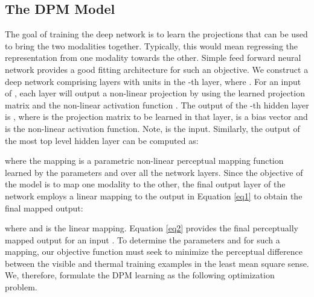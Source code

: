\documentclass[smallextended,natbib]{svjour3}       \usepackage{graphicx}
\begin{document}
\subsection{The DPM Model}
The goal of training the deep network is to learn the projections that can be used to bring the two modalities together. Typically, this would mean regressing the representation from one modality towards the other. Simple feed forward neural network provides a good fitting architecture for such an objective. We construct a deep network comprising  layers with  units in the -th layer, where . For an input of , each layer will output a non-linear projection by using the learned projection matrix  and the non-linear activation function . The output of the -th hidden layer is , where  is the projection matrix to be learned in that layer,  is a bias vector and  is the non-linear activation function. Note,  is the input. Similarly, the output of the most top level hidden layer can be computed as:

where the mapping  is a parametric non-linear perceptual mapping function learned by the parameters  and  over all the network layers.
Since the objective of the model is to map one modality to the other, the final output layer of the network employs a linear mapping to the output in Equation \ref{eq1} to  obtain the final mapped output:

where  and  is the linear mapping. Equation \ref{eq2} provides the final perceptually mapped output  for an input .
To determine the parameters  and  for such a mapping, our objective function must seek to minimize the perceptual difference between the visible and thermal training examples in the least mean square sense. We, therefore, formulate the DPM learning as the following optimization problem.
\end{document}
